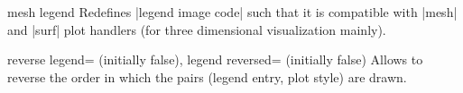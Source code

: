 \begin{pgfplotskey}{mesh legend}
    Redefines |legend image code| such that it is compatible with |mesh| and
    |surf| plot handlers (for three dimensional visualization mainly).
\pgfplotsexpensiveexample
\begin{codeexample}[]
\end{codeexample}
\end{pgfplotskey}

\begin{pgfplotskeylist}{%
    reverse legend= (initially false),%
    legend reversed= (initially false)%
}
    Allows to reverse the order in which the pairs (legend entry, plot style)
    are drawn.
\begin{codeexample}[]
\end{codeexample}
\end{pgfplotskeylist}

